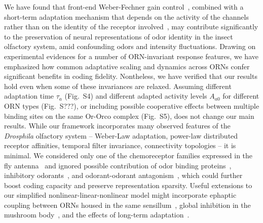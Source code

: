 \documentclass[9pt,twocolumn,twoside]{pnas-new}
\begin{document}
We have found that front-end Weber-Fechner gain control~\cite{srinivas_elife,cafaro_WL,cao_WL},
combined with a short-term adaptation mechanism that depends on the activity of the channels rather than on the identity of the receptor involved~\cite{nagel_wilson_biophysical,martelli,srinivas_elife,si2017invariances}, may contribute significantly to the preservation of neural representations of odor identity in the insect olfactory system, amid confounding odors and intensity fluctuations. Drawing on experimental evidences for a number of ORN-invariant response features, we have emphasized how common adaptative scaling and dynamics across ORNs confer significant benefits in coding fidelity. Nontheless, we have verified that our results hold even when some of these invariances are relaxed. Assuming different adaptation time $\tau_a$ (Fig.~S4) and different adapted activity levels $A_{a0}$ for different ORN types (Fig.~S???), or including possible cooperative effects between multiple binding sites on the same Or-Orco complex (Fig.~S5), does not change our main results.
While our framework incorporates many observed features of the \textit{Drosphila} olfactory system -- Weber-Law adaptation, power-law distributed receptor affinities, temporal filter invariance, connectivity topologies --  it is minimal. We considered only one of the chemoreceptor families expressed in the fly antenna~\cite{chemoreceptors_review} and ignored possible contribution of odor binding proteins~\cite{vogt1981pheromone,menuz2014rna}, inhibitory odorants~\cite{Cao_Tu_WL}, and odorant-odorant antagonism~\cite{reddy2017antagonism}, which could further boost coding capacity and preserve representation sparsity. %
Useful extensions to our simplified nonlinear-linear-nonlinear model might incorporate ephaptic coupling between ORNs housed in the same sensillum~\cite{ephactic}, global inhibition in the mushroom body~\cite{giant_inhibitory_neuron}, and the effects of long-term adaptation~\cite{Guo_Smith}. 
\end{document}
